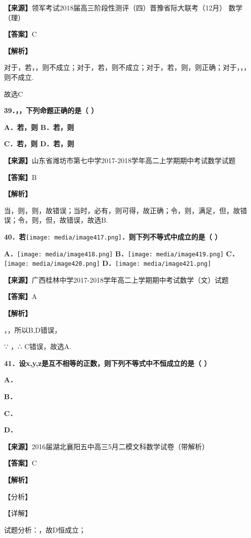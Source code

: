 \textbf{【来源】}领军考试2018届高三阶段性测评（四）晋豫省际大联考（12月）
数学（理）

\textbf{【答案】}C

\textbf{【解析】}

对于，若，，则不成立；对于，若，则不成立；对于，若，则，则正确；对于，，，则不成立.

故选C

\textbf{39．，，下列命题正确的是（ ）}

\textbf{A．若，则 B．若，则}

\textbf{C．若，则 D．若，则}

\textbf{【来源】}山东省潍坊市第七中学2017-2018学年高二上学期期中考试数学试题

\textbf{【答案】}B

\textbf{【解析】}

当，则，则，故错误；当时，必有，则可得，故正确；令，则，满足，但，故错误；令，则，但，故错误，故选B.

\textbf{40．若}\texttt{[image: media/image417.png]}\textbf{．则下列不等式中成立的是（
）}

\textbf{A．}\texttt{[image: media/image418.png]}
\textbf{B．}\texttt{[image: media/image419.png]}
\textbf{C．}\texttt{[image: media/image420.png]}
\textbf{D．}\texttt{[image: media/image421.png]}

\textbf{【来源】}广西桂林中学2017-2018学年高二上学期期中考试数学（文）试题

\textbf{【答案】}A

\textbf{【解析】}

，，所以B,D错误，

∵ ，∴ C错误，故选A.

\textbf{41．设x,y,z是互不相等的正数，则下列不等式中不恒成立的是（ ）}

\textbf{A．}

\textbf{B．}

\textbf{C．}

\textbf{D．}

\textbf{【来源】}2016届湖北襄阳五中高三5月二模文科数学试卷（带解析）

\textbf{【答案】}C

\textbf{【解析】}

【分析】

【详解】

试题分析：，故D恒成立；

